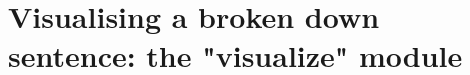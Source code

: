 \chapter{Visualising a broken down sentence: the "visualize" module}
\label{chap:visualize-module}


